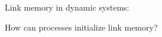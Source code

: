 \documentclass[10pt, xcolor={usenames, dvipsnames}]{beamer}
\newcommand{\xmark}{\ding{55}}
\newcommand{\NO}[1]{\textcolor{red}{#1}}
\begin{document}
\begin{frame}{Link memory in dynamic systems: \NO{\xmark}}
  



\end{frame}


\begin{frame}[standout]
  How can processes initialize link memory?
\end{frame}
\end{document}
